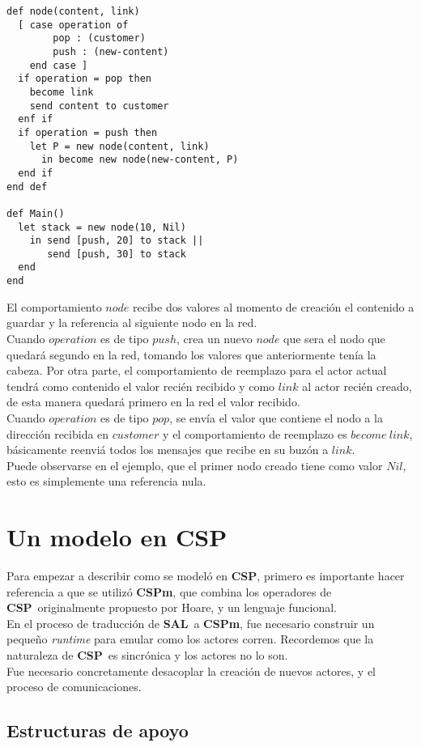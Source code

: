 \documentclass[fleqn]{article}
\newcommand{\SAL}{\textbf{SAL}}
\newcommand{\CSP}{\textbf{CSP}}
\newcommand{\CSPm}{\textbf{CSPm}}
\begin{document}
\begin{lstlisting}[language=sal, style=simple]
def node(content, link)
  [ case operation of
        pop : (customer)
        push : (new-content)
    end case ]
  if operation = pop then
    become link
    send content to customer
  enf if
  if operation = push then
    let P = new node(content, link)
      in become new node(new-content, P) 
  end if
end def

def Main() 
  let stack = new node(10, Nil)
    in send [push, 20] to stack ||
       send [push, 30] to stack
  end
end
\end{lstlisting}

El comportamiento $node$ recibe dos valores al momento de creación el contenido a guardar y la referencia al siguiente nodo en la red. \\
Cuando $operation$ es de tipo $push$, crea un nuevo $node$ que sera el nodo que quedará segundo en la red, 
tomando los valores que anteriormente tenía la cabeza. Por otra parte, el comportamiento de reemplazo para el actor actual tendrá 
como contenido el valor recién recibido y como $link$ al actor recién creado, de esta manera quedará primero en la red el valor recibido. \\
Cuando $operation$ es de tipo $pop$, se envía el valor que contiene el nodo a la dirección recibida en $customer$ y el comportamiento 
de reemplazo es $become\ link$, básicamente reenviá todos los mensajes que recibe en su buzón a $link$. \\
Puede observarse en el ejemplo, que el primer nodo creado tiene como valor $Nil$, esto es simplemente una referencia nula. 

\section{Un modelo en CSP}
Para empezar a describir como se modeló en \CSP, primero es importante hacer
referencia a que se utilizó \CSPm \cite{fdr}, que combina los operadores de \CSP\ 
originalmente propuesto por Hoare\cite{Hoare:1978:CSP:359576.359585}, y un lenguaje funcional. \\
En el proceso de traducción de \SAL\ a \CSPm, fue necesario construir un pequeño
\textit{runtime} para emular como los actores corren. Recordemos que la
naturaleza de \CSP\ es sincrónica y los actores no lo son. \\
Fue necesario concretamente desacoplar la creación de nuevos actores, y el proceso de comunicaciones. 

\subsection{Estructuras de apoyo}
\end{document}
